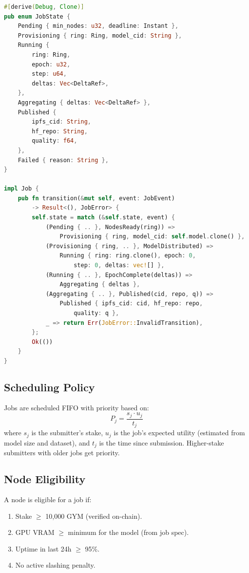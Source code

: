 \documentclass[11pt,letterpaper]{article}
\begin{document}
\begin{lstlisting}[language=Rust,caption=Job state machine]
#[derive(Debug, Clone)]
pub enum JobState {
    Pending { min_nodes: u32, deadline: Instant },
    Provisioning { ring: Ring, model_cid: String },
    Running {
        ring: Ring,
        epoch: u32,
        step: u64,
        deltas: Vec<DeltaRef>,
    },
    Aggregating { deltas: Vec<DeltaRef> },
    Published {
        ipfs_cid: String,
        hf_repo: String,
        quality: f64,
    },
    Failed { reason: String },
}

impl Job {
    pub fn transition(&mut self, event: JobEvent)
        -> Result<(), JobError> {
        self.state = match (&self.state, event) {
            (Pending { .. }, NodesReady(ring)) =>
                Provisioning { ring, model_cid: self.model.clone() },
            (Provisioning { ring, .. }, ModelDistributed) =>
                Running { ring: ring.clone(), epoch: 0,
                    step: 0, deltas: vec![] },
            (Running { .. }, EpochComplete(deltas)) =>
                Aggregating { deltas },
            (Aggregating { .. }, Published(cid, repo, q)) =>
                Published { ipfs_cid: cid, hf_repo: repo,
                    quality: q },
            _ => return Err(JobError::InvalidTransition),
        };
        Ok(())
    }
}
\end{lstlisting}

\subsection{Scheduling Policy}

Jobs are scheduled FIFO with priority based on:
\begin{equation}
    P_j = \frac{s_j \cdot u_j}{t_j}
\end{equation}
where $s_j$ is the submitter's stake, $u_j$ is the job's expected utility (estimated from model size and dataset), and $t_j$ is the time since submission.  Higher-stake submitters with older jobs get priority.

\subsection{Node Eligibility}

A node is eligible for a job if:
\begin{enumerate}
    \item Stake $\geq$ 10{,}000 GYM (verified on-chain).
    \item GPU VRAM $\geq$ minimum for the model (from job spec).
    \item Uptime in last 24h $\geq$ 95\%.
    \item No active slashing penalty.
\end{enumerate}
\end{document}
